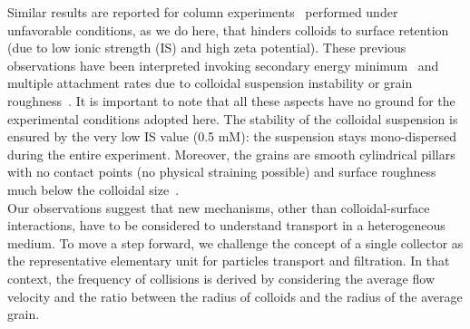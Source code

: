 \documentclass[singlecolumn,pre,notitlepage,preprintnumbers,floatfix,superscriptaddress]{revtex4-1}
\begin{document}
\noindent
Similar results are reported for column experiments~\cite{Tufenkjy_breacking_CFT, Sheibe} performed under unfavorable conditions, as we do here, that hinders colloids to surface retention (due to low ionic strength (IS) and high zeta potential). These previous observations have been interpreted invoking secondary energy minimum~\cite{Bradford2003} and multiple attachment rates due to colloidal suspension instability or grain roughness~\cite{Johnson2018}. It is important to note that all these aspects have no ground for the experimental conditions adopted here. The stability of the colloidal suspension is ensured by the very low IS value (0.5 mM): the suspension stays mono-dispersed during the entire experiment. Moreover, the grains are smooth cylindrical pillars with no contact points (no physical straining possible) and surface roughness much below the colloidal size~\cite{rusconi_microfluidics_2014}. \\

\noindent
Our observations suggest that new mechanisms, other than colloidal-surface interactions, have to be considered to understand transport in a heterogeneous medium. To move a step forward, we challenge the concept of a single collector \cite{Happel_1958} as the representative elementary unit for particles transport and filtration. In that context, the frequency of collisions is derived by considering the average flow velocity and the ratio between the radius of colloids and the radius of the average grain. \\ 
\end{document}
